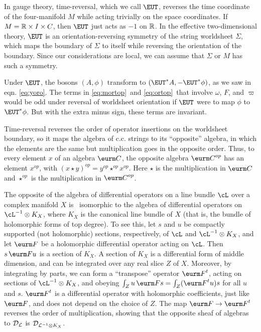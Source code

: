 In gauge theory, time-reversal, which we  call ${\EUT}$, reverses
the time coordinate of the four-manifold $M$ while acting
trivially on the space coordinates.  If $M=\Bbb{R}\times I\times
C$, then ${\EUT}$ just acts as $-1$ on $\Bbb{R}$. In the effective
two-dimensional theory, ${\EUT}$ is an orientation-reversing
symmetry of the string worldsheet $\Sigma$, which maps the
boundary of $\Sigma$ to itself while reversing the orientation of
the boundary.  Since our considerations are local, we can assume
that $\Sigma$ or $M$ has such a symmetry.

Under ${\EUT}$, the bosons $(A,\phi)$ transform to
$({\EUT}^*A,-{\EUT}^*\phi)$, as we saw in eqn. \eqref{eq:yoro}.  The terms
in \eqref{eq:mortop}\ and \eqref{eq:ortop}\ that involve $\omega$, $F$, and $\varpi$
would be odd under reversal of worldsheet orientation if ${\EUT}$
were to map $\phi$ to ${\EUT}^*\phi$. But with the extra minus
sign, these terms are invariant.

Time-reversal reverses the order of operator insertions on the
worldsheet boundary, so it maps the algebra of c.c. strings to its
``opposite'' algebra, in which the elements are the same but
multiplication goes in the opposite order. Thus, to every element
$x$ of an algebra ${\eurm C}$, the opposite algebra ${\eurm
C}^{op}$ has an element $x^{op}$, with $(x\star
y)^{op}=y^{op}\star^{op} x^{op}$.  Here $\star $ is the
multiplication in ${\eurm C}$ and $\star^{op}$ is the
multiplication in ${\eurm C}^{op}$.

  
The opposite of the algebra of differential operators on a line
bundle $\cL$ over a complex  manifold $X$ is \cite{ref140}\ isomorphic
to the algebra of differential operators on $\cL^{-1}\otimes K_X$,
where $K_X$ is the canonical line bundle of $X$ (that is, the
bundle of holomorphic forms of top degree). To see this, let $s$
and $u$ be compactly supported (not holomorphic) sections,
respectively, of $\cL$ and $\cL^{-1}\otimes K_X$, and let ${\eurm
F}$ be a holomorphic differential operator acting on $\cL$.  Then
$s\, {{\eurm F}}u$ is a section of $K_X$. A section of $K_X$ is a
differential form of middle dimension, and can be integrated over
any real slice $Z$ of $X$. Moreover, by integrating by parts, we
can form a ``transpose'' operator ${{\eurm F}}^t$, acting on
sections of $\cL^{-1}\otimes K_X$, and obeying $\int_Z u\,{{\eurm
F}} s=\int_Z ({\eurm F}^t u)s$ for all $u$ and $s$. ${{\eurm
F}}^t$ is a differential operator with holomorphic coefficients,
just like ${{\eurm F}}$, and does not depend on the choice of $Z$.
The map ${{\eurm F}}\to {{\eurm F}}^t$ reverses the order of
multiplication, showing that the opposite sheaf of algebras to
${\cal D}_{\cal L}$ is ${\cal D}_{{\cal L}^{-1}\otimes K_X}$.

